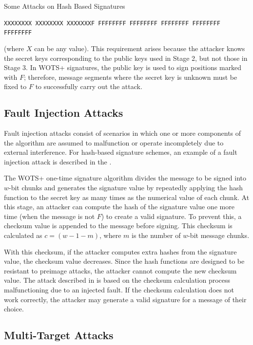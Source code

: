 \begin{section}{Some Attacks on Hash Based Signatures}
\begin{center}
\texttt{XXXXXXXX XXXXXXXX XXXXXXXF FFFFFFFF FFFFFFFF FFFFFFFF FFFFFFFF FFFFFFFF}
\end{center}

(where \( X \) can be any value). This requirement arises because the attacker knows the secret keys corresponding to the public keys used in Stage 2, but not those in Stage 3. In WOTS+ signatures, the public key is used to sign positions marked with \( F \); therefore, message segments where the secret key is unknown must be fixed to \( F \) to successfully carry out the attack.

\subsection{Fault Injection Attacks}

Fault injection attacks consist of scenarios in which one or more components of the algorithm are assumed to malfunction or operate incompletely due to external interference. For hash-based signature schemes, an example of a fault injection attack is described in the \cite{wagner2023faulting}.

The WOTS+ one-time signature algorithm divides the message to be signed into $w$-bit chunks and generates the signature value by repeatedly applying the hash function to the secret key as many times as the numerical value of each chunk. At this stage, an attacker can compute the hash of the signature value one more time (when the message is not $F$) to create a valid signature. To prevent this, a checksum value is appended to the message before signing. This checksum is calculated as $c = (w - 1 - m)$, where $m$ is the number of $w$-bit message chunks.

With this checksum, if the attacker computes extra hashes from the signature value, the checksum value decreases. Since the hash functions are designed to be resistant to preimage attacks, the attacker cannot compute the new checksum value. The attack described in \cite{wagner2023faulting} is based on the checksum calculation process malfunctioning due to an injected fault. If the checksum calculation does not work correctly, the attacker may generate a valid signature for a message of their choice.

\subsection{Multi-Target Attacks}


\end{section}
